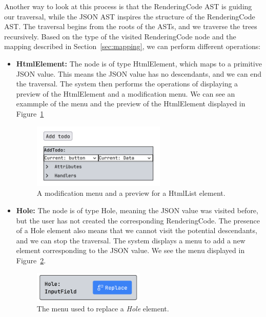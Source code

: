 Another way to look at this process is that the RenderingCode AST is guiding our traversal, while the JSON AST inspires the structure of the RenderingCode AST.
The traversal begins from the roots of the ASTs, and we traverse the trees recursively.
Based on the type of the visited RenderingCode node and the mapping described in Section~\ref{sec:mapping}, we can perform different operations:
\begin{itemize}
	\item \textbf{HtmlElement:} The node is of type HtmlElement, which maps to a primitive JSON value. This means the JSON value has no descendants, and we can end the traversal.
	      The system then performs the operations of displaying a preview of the HtmlElement and a modification menu. We can see an exammple of the menu and the preview of the HtmlElement displayed in Figure~\ref{fig:htmlElementMenu}
	      \begin{figure}[htbp]
		      \begin{center}
			      \includegraphics[width=0.6\textwidth]{img/htmlElementMenu.pdf}
		      \end{center}
		      \caption{A modification menu and a preview for a HtmlList element.}\label{fig:htmlElementMenu}
	      \end{figure}


	\item \textbf{Hole:} The node is of type Hole, meaning the JSON value was visited before, but the user has not created the corresponding RenderingCode.
	      The presence of a Hole element also means that we cannot visit the potential descendants, and we can stop the traversal.
	      The system displays a menu to add a new element corresponding to the JSON value. We see the menu displayed in Figure~\ref{fig:replaceHoleMenu}.
	      \begin{figure}[htbp]
		      \begin{center}
			      \includegraphics[width=0.5\textwidth]{img/replaceHoleMenu.pdf}
		      \end{center}
		      \caption{The menu used to replace a \emph{Hole} element.}\label{fig:replaceHoleMenu}
	      \end{figure}



\end{itemize}
